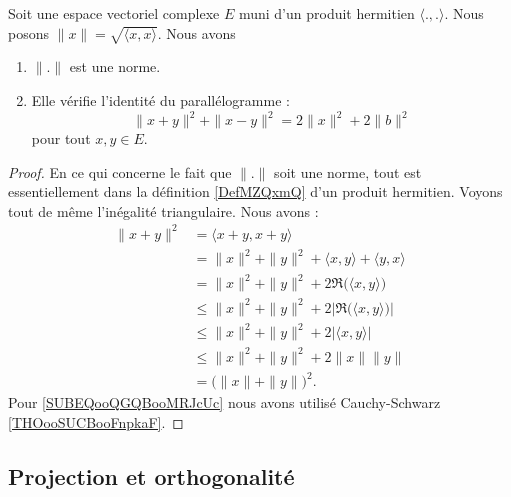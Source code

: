 \begin{proposition}       \label{PROPooSSYJooHAXAnC}
    Soit une espace vectoriel complexe \( E\) muni d'un produit hermitien \( \langle ., .\rangle \). Nous posons \( \| x \|=\sqrt{ \langle x, x\rangle  }\). Nous avons
    \begin{enumerate}
        \item
            \( \| . \|\) est une norme.
        \item
            Elle vérifie l'identité du parallélogramme :
            \begin{equation}
                \| x+y \|^2+\| x-y \|^2=2\| x \|^2+2\| b \|^2
            \end{equation}
            pour tout \( x,y\in E\).
    \end{enumerate}
\end{proposition}

\begin{proof}
    En ce qui concerne le fait que \( \| . \|\) soit une norme, tout est essentiellement dans la définition \ref{DefMZQxmQ} d'un produit hermitien. Voyons tout de même l'inégalité triangulaire. Nous avons :
    \begin{subequations}
        \begin{align}
            \| x+y \|^2&=\langle x+y, x+y\rangle\\
            &=\| x \|^2+\| y \|^2+\langle x, y\rangle +\langle y, x\rangle\\
            &=\| x \|^2+\| y \|^2+2\Re\big( \langle x, y\rangle  \big)\\
            &\leq\| x \|^2+\| y \|^2+2|\Re\big( \langle x, y\rangle  \big)|\\
            &\leq\| x \|^2+\| y \|^2+2| \langle x, y\rangle  |\\
            &\leq \| x \|^2+\| y \|^2+2\| x \|\| y \|\label{SUBEQooQGQBooMRJcUc}\\
            &=\big( \| x \|+\| y \| \big)^2.
        \end{align}
    \end{subequations}
    Pour \eqref{SUBEQooQGQBooMRJcUc} nous avons utilisé Cauchy-Schwarz \ref{THOooSUCBooFnpkaF}.
\end{proof}

\subsection{Projection et orthogonalité}

